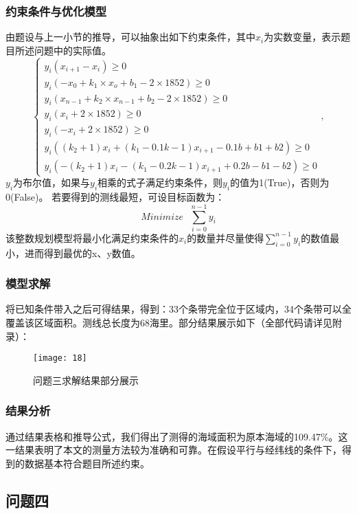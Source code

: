 \documentclass[withoutpreface,bwprint]{cumcmthesis} %
\begin{document}
\subsubsection{约束条件与优化模型}
由题设与上一小节的推导，可以抽象出如下约束条件，其中$x_i$为实数变量，表示题目所述问题中的实际值。
\begin{equation}
\left\{
\begin{aligned}
y_i(x_{i+1}-x_i)\geq0\\
y_i(-x_0+k_1\times x_o+b_1-2\times1852)\geq0\\
y_i(x_{n-1}+k_2\times x_{n-1}+b_2-2\times1852)\geq0\\
y_i({x_i+2\times1852})\geq0\\
y_i(-x_i+2\times1852)\geq0\\
y_i((k_2+1)x_i+(k_1-0.1k-1)x_{i+1}-0.1b+b1+b2)\geq0\\
y_i(-(k_2+1)x_i-(k_1-0.2k-1)x_{i+1}+0.2b-b1-b2)\geq0
\end{aligned}
\right.
,
\end{equation}
$y_i$为布尔值，如果与$y_i$相乘的式子满足约束条件，则$y_i$的值为1(True)，否则为0(False)。
若要得到的测线最短，可设目标函数为：
\begin{equation}
Minimize\ \ \ \sum_{i=0}^{n-1}{y_i}
\end{equation}
该整数规划模型将最小化满足约束条件的$x_i$的数量并尽量使得$\sum_{i=0}^{n-1}{y_i}$的数值最小，进而得到最优的x、y数值。
\subsubsection{模型求解}
将已知条件带入之后可得结果，得到：33个条带完全位于区域内，34个条带可以全覆盖该区域面积。测线总长度为68海里。部分结果展示如下（全部代码请详见附录）：
\begin{figure}[H]
    \centering
    \texttt{[image: 18]}
    \caption{问题三求解结果部分展示}
    \label{fig:four}
\end{figure}
\subsubsection{结果分析}
通过结果表格和推导公式，我们得出了测得的海域面积为原本海域的109.47\%。这一结果表明了本文的测量方法较为准确和可靠。在假设平行与经纬线的条件下，得到的数据基本符合题目所述约束。
\subsection{问题四}
\end{document}
